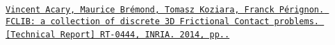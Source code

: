 \href{https://hal.inria.fr/hal-00945820v2/document}{\tt Vincent Acary, Maurice Br\'{e}mond, Tomasz Koziara, Franck P\'{e}rignon. F\+C\+L\+I\+B\+: a collection of discrete 3D Frictional Contact problems. \mbox{[}Technical Report\mbox{]} R\+T-\/0444, I\+N\+R\+IA. 2014, pp..} ~\newline


~\newline
 

~\newline
 
